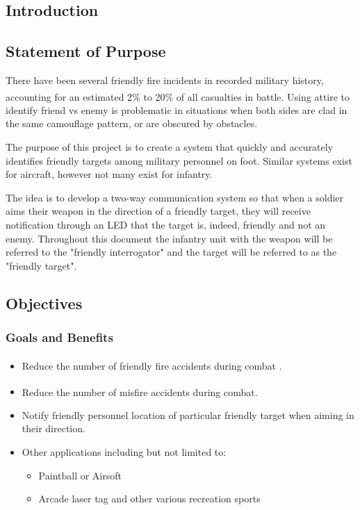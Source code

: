 \documentclass[letterpaper,10pt]{article}
\newcommand{\buildtoc}{
	\clearpage
	\singlespacing
	\tableofcontents
	\onehalfspacing
}
\begin{document}
\maketitle
\pagestyle{fancy}
\begin{spacing}{1.15}


\color{black}
\buildtoc
{}
\clearpage
\setcounter{page}{1}

\section{Introduction}
\subsection{Statement of Purpose}
There have been several friendly fire incidents in recorded military history, accounting for an estimated 2\% to 20\% of all casualties in battle\textsuperscript{\cite{USArmy}}. Using attire to identify friend vs enemy is problematic in situations when both sides are clad in the same camouflage pattern, or are obscured by obstacles.

The purpose of this project is to create a system that quickly and accurately identifies friendly targets among military personnel on foot. Similar systems exist for aircraft, however not many exist for infantry.

The idea is to develop a two-way communication system so that when a soldier aims their weapon in the direction of a friendly target, they will receive notification through an LED that the target is, indeed, friendly and not an enemy. Throughout this document the infantry unit with the weapon will be referred to the "friendly interrogator" and the target will  be referred to as the "friendly target". 

\subsection{Objectives}
\subsubsection{Goals and Benefits}
\begin{itemize}
	\item Reduce the number of friendly fire accidents during combat \textsuperscript{\cite{Garrison}}.
	\item Reduce the number of misfire accidents during combat\textsuperscript{\cite{Garrison}}.
	\item Notify friendly personnel location of particular friendly target when aiming in their direction.
	\item Other applications including but not limited to:
	\begin{itemize}
		\item Paintball or Airsoft
		\item Arcade laser tag and other various recreation sports
	\end{itemize}
\end{itemize}

\end{spacing}
\end{document}
